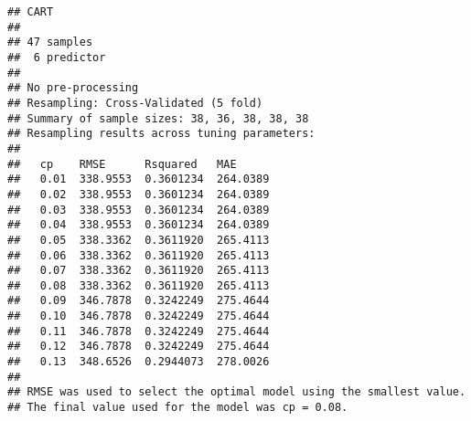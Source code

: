 \documentclass[
]{article}
\newenvironment{Shaded}{\begin{snugshade}}{\end{snugshade}}
\newcommand{\AttributeTok}[1]{\textcolor[rgb]{0.13,0.29,0.53}{#1}}
\newcommand{\DecValTok}[1]{\textcolor[rgb]{0.00,0.00,0.81}{#1}}
\newcommand{\FloatTok}[1]{\textcolor[rgb]{0.00,0.00,0.81}{#1}}
\newcommand{\FunctionTok}[1]{\textcolor[rgb]{0.13,0.29,0.53}{\textbf{#1}}}
\newcommand{\NormalTok}[1]{#1}
\newcommand{\OtherTok}[1]{\textcolor[rgb]{0.56,0.35,0.01}{#1}}
\newcommand{\SpecialCharTok}[1]{\textcolor[rgb]{0.81,0.36,0.00}{\textbf{#1}}}
\newcommand{\StringTok}[1]{\textcolor[rgb]{0.31,0.60,0.02}{#1}}
\begin{document}
\begin{Shaded}
\end{Shaded}

\begin{verbatim}
## CART 
## 
## 47 samples
##  6 predictor
## 
## No pre-processing
## Resampling: Cross-Validated (5 fold) 
## Summary of sample sizes: 38, 36, 38, 38, 38 
## Resampling results across tuning parameters:
## 
##   cp    RMSE      Rsquared   MAE     
##   0.01  338.9553  0.3601234  264.0389
##   0.02  338.9553  0.3601234  264.0389
##   0.03  338.9553  0.3601234  264.0389
##   0.04  338.9553  0.3601234  264.0389
##   0.05  338.3362  0.3611920  265.4113
##   0.06  338.3362  0.3611920  265.4113
##   0.07  338.3362  0.3611920  265.4113
##   0.08  338.3362  0.3611920  265.4113
##   0.09  346.7878  0.3242249  275.4644
##   0.10  346.7878  0.3242249  275.4644
##   0.11  346.7878  0.3242249  275.4644
##   0.12  346.7878  0.3242249  275.4644
##   0.13  348.6526  0.2944073  278.0026
## 
## RMSE was used to select the optimal model using the smallest value.
## The final value used for the model was cp = 0.08.
\end{verbatim}
\end{document}
